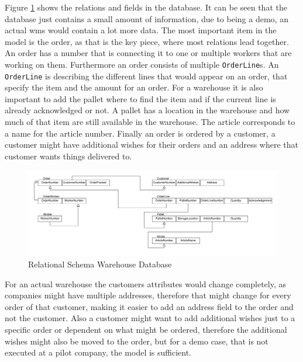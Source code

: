 Figure \ref{fig:LogicalModelWMS} shows the relations and fields in the database. It can be seen that the database just contains a small amount of information, due to being a demo, an actual \gls{wms} would contain a lot more data. The most important item in the model is the order, as that is the key piece, where most relations lead together. An order has a number that is connecting it to one or multiple workers that are working on them. Furthermore an order consists of multiple \texttt{OrderLine}s. An \texttt{OrderLine} is describing the different lines that would appear on an order, that specify the item and the amount for an order. For a warehouse it is also important to add the pallet where to find the item and if the current line is already acknowledged or not. A pallet has a location in the warehouse and how much of that item are still available in the warehouse. The article corresponds to a name for the article number. Finally an order is ordered by a customer, a customer might have additional wishes for their orders and an address where that customer wants things delivered to.

\begin{figure}[H]
	\includegraphics[width=\textwidth]{images/LogicalModel_MockWMS}
	\caption{Relational Schema Warehouse Database}
	\label{fig:LogicalModelWMS}
\end{figure}

For an actual warehouse the customers attributes would change completely, as companies might have multiple addresses, therefore that might change for every order of that customer, making it easier to add an address field to the order and not the customer.  Also a customer might want to add additional wishes just to a specific order or dependent on what might be ordered, therefore the additional wishes might also be moved to the order, but for a demo case, that is not executed at a pilot company, the model is sufficient.

